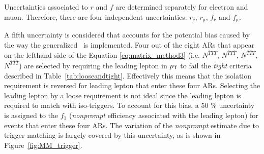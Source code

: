 Uncertainties associated to $r$ and $f$ are determined separately for electron and muon. Therefore, there are four independent uncertainties: $r_{\textsf{e}}$, $r_{\upmu}$, $f_{\textsf{e}}$ and $f_{\upmu}$. 

A fifth uncertainty is considered that accounts for the potential bias caused by the way the generalized \mm~is implemented. Four out of the eight \acp{AR} that appear on the lefthand side of the Equation \ref{eq:matrix_method3} (i.e. $N^{\overline{T}TT}$, $N^{\overline{T}T\overline{T}}$, $N^{\overline{T}\overline{T}T}$, $N^{\overline{T}\overline{T}\overline{T}}$) are selected by requiring the leading lepton in $p_{\textsf{T}}$ to fail the \emph{tight} criteria described in Table~\ref{tab:looseandtight}. Effectively this means that the isolation requirement is reversed for leading lepton that enter these four \acp{AR}. Selecting the leading lepton by a loose requirement is not ideal since the leading lepton is required to match with iso-triggers. To account for this bias, a 50 $\%$ uncertainty is assigned to the $f_1$ (\emph{nonprompt} efficiency associated with the leading lepton) for events that enter these four \acp{AR}. The variation of the \emph{nonprompt} estimate due to trigger matching is largely covered by this uncertainty, as is shown in Figure~\ref{fig:MM_trigger}.

